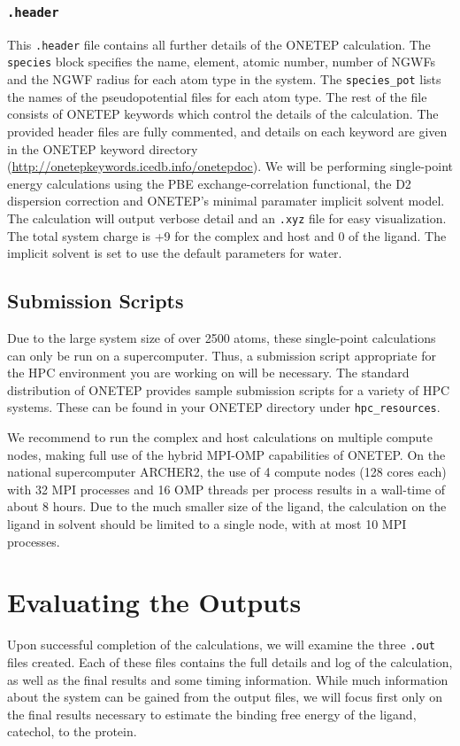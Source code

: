 \documentclass{article}
\begin{document}
\subsubsection{\texttt{.header}}
This \verb|.header| file contains all further details of the ONETEP calculation. The \verb|species| block specifies the name, element, atomic number, number of NGWFs and the NGWF radius for each atom type in the system. The \verb|species_pot| lists the names of the pseudopotential files for each atom type. The rest of the file consists of ONETEP keywords which control the details of the calculation. The provided header files are fully commented, and details on each keyword are given in the ONETEP keyword directory (\url{http://onetepkeywords.icedb.info/onetepdoc}). We will be performing single-point energy calculations using the PBE exchange-correlation functional, the D2 dispersion correction and ONETEP's minimal paramater implicit solvent model. The calculation will output verbose detail and an \verb|.xyz| file for easy visualization. The total system charge is +9 for the complex and host and 0 of the ligand. The implicit solvent is set to use the default parameters for water. 

\subsection{Submission Scripts}
Due to the large system size of over 2500 atoms, these single-point calculations can only be run on a supercomputer. Thus, a submission script appropriate for the HPC environment you are working on will be necessary. The standard distribution of ONETEP provides sample submission scripts for a variety of HPC systems. These can be found in your ONETEP directory under \verb|hpc_resources|. 

We recommend to run the complex and host calculations on multiple compute nodes, making full use of the hybrid MPI-OMP capabilities of ONETEP. On the national supercomputer ARCHER2, the use of 4 compute nodes (128 cores each) with 32 MPI processes and 16 OMP threads per process results in a wall-time of about 8 hours. Due to the much smaller size of the ligand, the calculation on the ligand in solvent should be limited to a single node, with at most 10 MPI processes. 

\section{Evaluating the Outputs}
Upon successful completion of the calculations, we will examine the three \verb|.out| files created. Each of these files contains the full details and log of the calculation, as well as the final results and some timing information. While much information about the system can be gained from the output files, we will focus first only on the final results necessary to estimate the binding free energy of the ligand, catechol, to the protein. 
\end{document}
